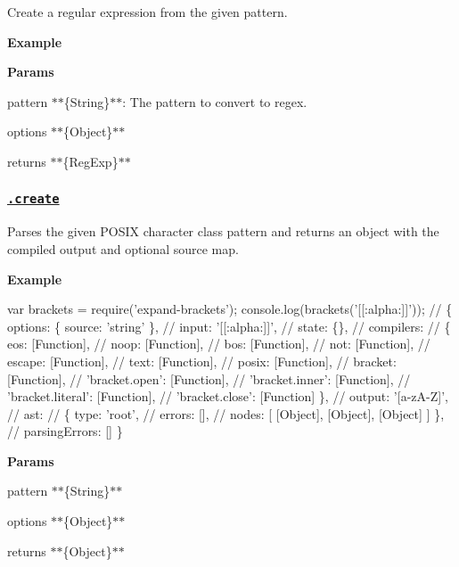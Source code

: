 Create a regular expression from the given {\ttfamily pattern}.

{\bfseries Example}




{\bfseries Params}


\begin{DoxyItemize}
\item {\ttfamily pattern} $\ast$$\ast$\{String\}$\ast$$\ast$\+: The pattern to convert to regex.
\item {\ttfamily options} $\ast$$\ast$\{Object\}$\ast$$\ast$
\item {\ttfamily returns} $\ast$$\ast$\{Reg\+Exp\}$\ast$$\ast$
\end{DoxyItemize}

\subsubsection*{\href{index.js#L187}{\tt .create}}

Parses the given P\+O\+S\+IX character class {\ttfamily pattern} and returns an object with the compiled {\ttfamily output} and optional source {\ttfamily map}.

{\bfseries Example}


\begin{DoxyCode}
var brackets = require('expand-brackets');
console.log(brackets('[[:alpha:]]'));
// \{ options: \{ source: 'string' \},
//   input: '[[:alpha:]]',
//   state: \{\},
//   compilers:
//    \{ eos: [Function],
//      noop: [Function],
//      bos: [Function],
//      not: [Function],
//      escape: [Function],
//      text: [Function],
//      posix: [Function],
//      bracket: [Function],
//      'bracket.open': [Function],
//      'bracket.inner': [Function],
//      'bracket.literal': [Function],
//      'bracket.close': [Function] \},
//   output: '[a-zA-Z]',
//   ast:
//    \{ type: 'root',
//      errors: [],
//      nodes: [ [Object], [Object], [Object] ] \},
//   parsingErrors: [] \}
\end{DoxyCode}


{\bfseries Params}


\begin{DoxyItemize}
\item {\ttfamily pattern} $\ast$$\ast$\{String\}$\ast$$\ast$
\item {\ttfamily options} $\ast$$\ast$\{Object\}$\ast$$\ast$
\item {\ttfamily returns} $\ast$$\ast$\{Object\}$\ast$$\ast$
\end{DoxyItemize}

